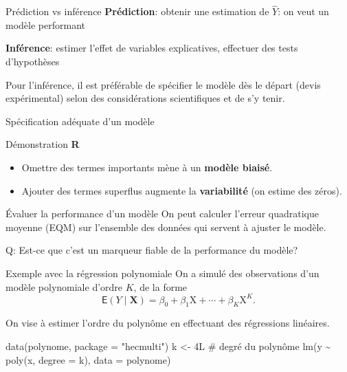 \documentclass[
  ignorenonframetext,
]{beamer}
\newenvironment{Shaded}{\begin{snugshade}}{\end{snugshade}}
\newcommand{\AttributeTok}[1]{\textcolor[rgb]{0.40,0.45,0.13}{#1}}
\newcommand{\CommentTok}[1]{\textcolor[rgb]{0.37,0.37,0.37}{#1}}
\newcommand{\DecValTok}[1]{\textcolor[rgb]{0.68,0.00,0.00}{#1}}
\newcommand{\FunctionTok}[1]{\textcolor[rgb]{0.28,0.35,0.67}{#1}}
\newcommand{\NormalTok}[1]{\textcolor[rgb]{0.00,0.23,0.31}{#1}}
\newcommand{\OtherTok}[1]{\textcolor[rgb]{0.00,0.23,0.31}{#1}}
\newcommand{\SpecialCharTok}[1]{\textcolor[rgb]{0.37,0.37,0.37}{#1}}
\newcommand{\StringTok}[1]{\textcolor[rgb]{0.13,0.47,0.30}{#1}}
\providecommand{\tightlist}{%
  \setlength{\itemsep}{0pt}\setlength{\parskip}{0pt}}\usepackage{longtable,booktabs,array}
\begin{document}
\begin{frame}{Prédiction vs inférence}
\label{pruxe9diction-vs-infuxe9rence}
\textbf{Prédiction}: obtenir une estimation de \(\widehat{Y}\): on veut
un modèle performant

\textbf{Inférence}: estimer l'effet de variables explicatives, effectuer
des tests d'hypothèses

Pour l'inférence, il est préférable de spécifier le modèle dès le départ
(devis expérimental) selon des considérations scientifiques et de s'y
tenir.
\end{frame}

\begin{frame}{Spécification adéquate d'un modèle}
\label{spuxe9cification-aduxe9quate-dun-moduxe8le}
\begin{block}{Démonstration \textbf{R}}
\label{duxe9monstration-r}
\begin{itemize}
\tightlist
\item
  Omettre des termes importants mène à un \textbf{modèle biaisé}.
\item
  Ajouter des termes superflus augmente la \textbf{variabilité} (on
  estime des zéros).
\end{itemize}
\end{block}
\end{frame}

\begin{frame}{Évaluer la performance d'un modèle}
\label{uxe9valuer-la-performance-dun-moduxe8le}
On peut calculer l'erreur quadratique moyenne (EQM) sur l'ensemble des
données qui servent à ajuster le modèle.

Q: Est-ce que c'est un marqueur fiable de la performance du modèle?
\end{frame}

\begin{frame}[fragile]{Exemple avec la régression polynomiale}
\label{exemple-avec-la-ruxe9gression-polynomiale}
On a simulé des observations d'un modèle polynomiale d'ordre \(K\), de
la forme
\[\mathsf{E}(Y \mid \mathbf{X}) = \beta_0 + \beta_1 \mathrm{X} + \cdots + \beta_K \mathrm{X}^K.\]

On vise à estimer l'ordre du polynôme en effectuant des régressions
linéaires.

\begin{Shaded}
\begin{Highlighting}[numbers=left,,]
\FunctionTok{data}\NormalTok{(polynome, }\AttributeTok{package =} \StringTok{"hecmulti"}\NormalTok{)}
\NormalTok{k }\OtherTok{\textless{}{-}} \DecValTok{4}\NormalTok{L }\CommentTok{\# degré du polynôme}
\FunctionTok{lm}\NormalTok{(y }\SpecialCharTok{\textasciitilde{}} \FunctionTok{poly}\NormalTok{(x, }\AttributeTok{degree =}\NormalTok{ k), }
   \AttributeTok{data =}\NormalTok{ polynome)}
\end{Highlighting}
\end{Shaded}
\end{frame}
\end{document}
